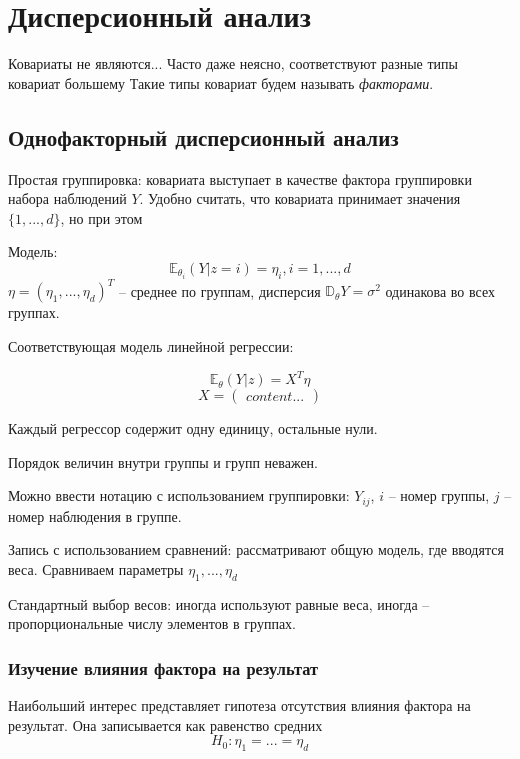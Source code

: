 \documentclass[main.tex]{subfiles}
\begin{document}
\section{Дисперсионный анализ}

Ковариаты не являются...
Часто даже неясно, соответствуют разные типы ковариат большему 
Такие типы ковариат будем называть  \emph{факторами}.

\subsection{Однофакторный дисперсионный анализ}

Простая группировка: ковариата выступает в качестве фактора группировки набора наблюдений $ Y $.
Удобно считать, что ковариата принимает значения $ \{ 1, ..., d \} $, но при этом

Модель:
\[ \mathds E_{\theta_i}(Y|z=i) = \eta_i, i = 1, ..., d \]
$ \eta = (\eta_1, ..., \eta_d)^T $ -- среднее по группам, дисперсия $ \mathds D_\theta Y = \sigma^2 $  одинакова во всех группах.

Соответствующая модель линейной регрессии:

 \[ \mathds E_\theta (Y|z) = X^T \eta \]
 \[ X = \begin{pmatrix}
 	content...
 \end{pmatrix}  \]


Каждый регрессор содержит одну единицу, остальные нули.

Порядок величин внутри группы и групп неважен.

Можно ввести нотацию с использованием группировки:
$ Y_{ij} $, $i$ -- номер группы, $j$ -- номер наблюдения в группе.

Запись с использованием сравнений: рассматривают общую модель, где вводятся веса.
Сравниваем параметры $ \eta_1, ..., \eta_d $ %

Стандартный выбор весов:
иногда используют равные веса, иногда -- пропорциональные числу элементов в группах.

\subsubsection{Изучение влияния фактора на результат}

Наибольший интерес представляет гипотеза отсутствия влияния фактора на результат.
Она записывается как равенство средних
\[ H_0 : \eta_1 = ... = \eta_d \]
\end{document}
